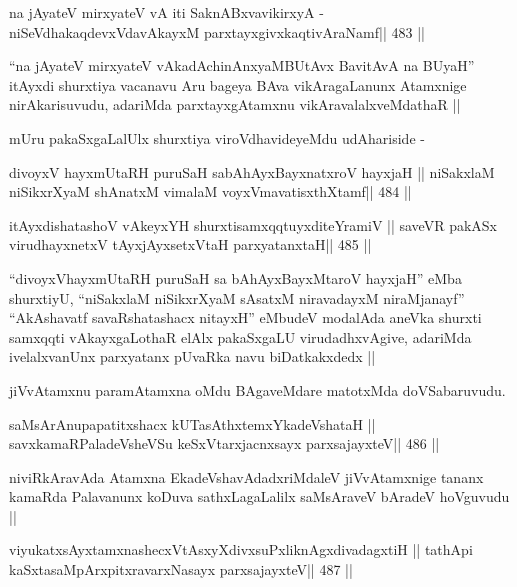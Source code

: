 \begin{shl}
na jAyateV mirxyateV vA iti SaknABxvavikirxyA -
niSeVdhakaqdevxVdavAkayxM parxtayxgivxkaqtivAraNamf\hfill || 483 ||
\end{shl}

\begin{artha}
``na jAyateV mirxyateV vAkadAchinAnxyaMBUtAvx BavitAvA na BUyaH''
  itAyxdi shurxtiya vacanavu Aru bageya BAva vikAragaLanunx Atamxnige
  nirAkarisuvudu, adariMda  parxtayxgAtamxnu vikAravalalxveMdathaR ||

mUru pakaSxgaLalUlx shurxtiya viroVdhavideyeMdu udAhariside -
\end{artha}

\begin{shl}
divoyxV hayxmUtaRH puruSaH sabAhAyxBayxnatxroV hayxjaH ||
niSakxlaM niSikxrXyaM shAnatxM vimalaM voyxVmavatisxthXtamf\hfill || 484 ||
\end{shl}

\begin{shl}
itAyxdishatashoV vAkeyxYH shurxtisamxqqtuyxditeYramiV ||
saveVR pakASx virudhayxnetxV tAyxjAyxsetxV\s taH parxyatanxtaH\hfill || 485 ||
\end{shl}

\begin{artha}
``divoyxVhayxmUtaRH puruSaH sa bAhAyxBayxMtaroV hayxjaH'' eMba
  shurxtiyU, ``niSakxlaM niSikxrXyaM sAsatxM niravadayxM niraMjanayf''
  ``AkAshavatf savaRshatashacx nitayxH'' eMbudeV modalAda aneVka
  shurxti samxqqti vAkayxgaLothaR elAlx pakaSxgaLU virudadhxvAgive,
  adariMda ivelalxvanUnx parxyatanx pUvaRka navu biDatkakxdedx ||
\end{artha}

\begin{artha}
jiVvAtamxnu paramAtamxna oMdu BAgaveMdare matotxMda doVSabaruvudu.
\end{artha}

\begin{shl}
saMsArAnupapatitxshacx kUTasAthxtemxYkadeVshataH ||
savxkamaRPaladeVsheVSu keSxVtarxjacnxsayx parxsajayxteV\hfill || 486 ||
\end{shl}

\begin{artha}
niviRkAravAda Atamxna EkadeVshavAdadxriMdaleV jiVvAtamxnige tananx
kamaRda Palavanunx koDuva sathxLagaLalilx saMsAraveV bAradeV hoVguvudu ||
\end{artha}

\begin{shl}
viyukatxsAyx\s\s tamxnashecxVtAsxyXdivxsuPxliknAgxdivadagxtiH ||
tathA\s pi kaSxtasaMpArxpitxravarxNasayx parxsajayxteV\hfill || 487 ||
\end{shl}


